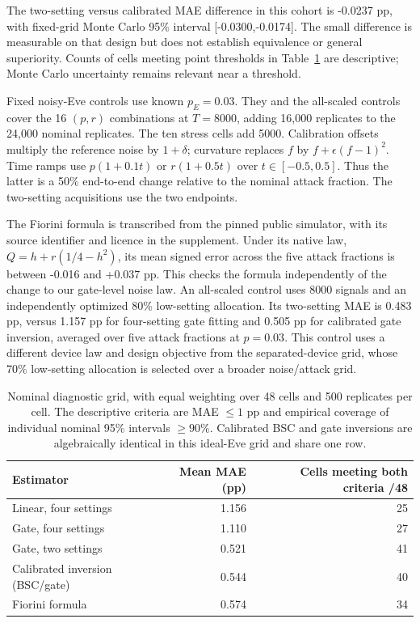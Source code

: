 The two-setting versus calibrated MAE difference in this cohort is -0.0237 pp,
with fixed-grid Monte Carlo 95\% interval [-0.0300,-0.0174]. The small difference
is measurable on that design but does not establish equivalence or general
superiority. Counts of cells meeting point thresholds in Table~\ref{tab:diagnostic}
are descriptive; Monte Carlo uncertainty remains relevant near a threshold.

Fixed noisy-Eve controls use known $p_E=0.03$. They and the all-scaled controls
cover the 16 $(p,r)$ combinations at $T=8000$, adding 16,000 replicates to the
24,000 nominal replicates. The ten stress cells add 5000. Calibration offsets multiply
the reference noise by $1+\delta$; curvature replaces $f$ by
$f+\epsilon(f-1)^2$. Time ramps use $p(1+0.1t)$ or $r(1+0.5t)$ over
$t\in[-0.5,0.5]$. Thus the latter is a 50\% end-to-end change relative to the
nominal attack fraction. The two-setting acquisitions use the two endpoints.

The Fiorini formula is transcribed from the pinned public simulator, with its source
identifier and licence in the supplement. Under its native law,
$Q=h+r(1/4-h^2)$, its mean signed error across the five attack fractions is between
-0.016 and +0.037 pp. This checks the formula independently of the change to our
gate-level noise law. An all-scaled control uses 8000 signals and an independently optimized
80\% low-setting allocation. Its two-setting MAE is 0.483 pp, versus 1.157 pp for
four-setting gate fitting and 0.505 pp for calibrated gate inversion, averaged over
five attack fractions at $p=0.03$. This control uses a
different device law and design objective from the separated-device grid, whose
70\% low-setting allocation is selected over a broader noise/attack grid.


\begin{table}[!htbp]
\centering
\small\setlength{\tabcolsep}{4pt}
\caption{Nominal diagnostic grid, with equal weighting over 48 cells and 500 replicates per cell. The descriptive criteria are MAE $\leq1$ pp and empirical coverage of individual nominal 95\% intervals $\geq90\%$. Calibrated BSC and gate inversions are algebraically identical in this ideal-Eve grid and share one row.}
\label{tab:diagnostic}
\begin{tabular}{@{}lrr@{}}
\toprule
Estimator & Mean MAE (pp) & Cells meeting both criteria /48 \\
\midrule
Linear, four settings & 1.156 & 25 \\
Gate, four settings & 1.110 & 27 \\
Gate, two settings & 0.521 & 41 \\
Calibrated inversion (BSC/gate) & 0.544 & 40 \\
Fiorini formula & 0.574 & 34 \\
\bottomrule
\end{tabular}
\end{table}

